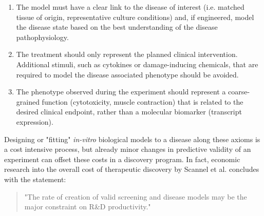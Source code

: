 \begin{flushleft}
\begin{enumerate}
    \item The model must have a clear link to the disease of interest (i.e. matched tissue of origin, representative culture conditions) and, if engineered, model the disease state based on the best understanding of the disease pathophysiology.
    \item The treatment should only represent the planned clinical intervention. Additional stimuli, such as cytokines or damage-inducing chemicals, that are required to model the disease associated phenotype should be avoided.
    \item The phenotype observed during the experiment should represent a coarse-grained function (cytotoxicity, muscle contraction) that is related to the desired clinical endpoint, rather than a molecular biomarker (transcript expression).
\end{enumerate}

Designing or "fitting" \textit{in-vitro} biological models to a disease along these axioms is a cost intensive process, but already minor changes in predictive validity of an experiment can offset these costs in a discovery program. In fact, economic research into the overall cost of therapeutic discovery by Scannel et al. \citep{scannellWhenQualityBeats2016} concludes with the statement:

\begin{quote}
"The rate of creation of valid screening and disease models may be the major constraint on R\&D productivity."
\end{quote}




\end{flushleft}